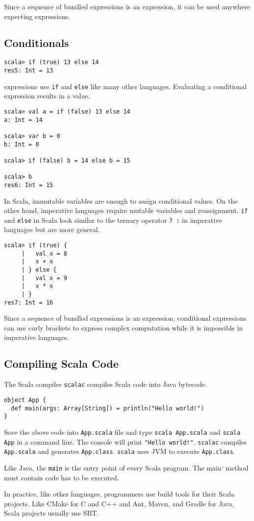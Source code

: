 Since a sequence of bundled expressions is an expression, it can be used
anywhere expecting expressions.

\subsection{Conditionals}

\begin{verbatim}
scala> if (true) 13 else 14
res5: Int = 13
\end{verbatim}

 expressions use \verb+if+ and \verb+else+ like many other languages.
Evaluating a conditional expression results in a value.

\begin{verbatim}
scala> val a = if (false) 13 else 14
a: Int = 14

scala> var b = 0
b: Int = 0

scala> if (false) b = 14 else b = 15

scala> b
res6: Int = 15
\end{verbatim}

In Scala, immutable variables are enough to assign conditional values. On the
other hand, imperative languages require mutable variables and reassignment.
\verb+if+ and \verb+else+ in Scala look similar to the ternary operator \verb+? :+ in
  imperative languages but are more general.

\begin{verbatim}
scala> if (true) {
     |   val x = 8
     |   x + x
     | } else {
     |   val x = 9
     |   x * x
     | }
res7: Int = 16
\end{verbatim}

Since a sequence of bundled expressions is an expression, conditional
expressions can use curly brackets to express complex computation while it is
impossible in imperative languages.

\subsection{Compiling Scala Code}

The Scala compiler \verb+scalac+ compiles Scala code into Java bytecode.

\begin{verbatim}
object App {
  def main(args: Array[String]) = println("Hello world!")
}
\end{verbatim}

Save the above code into \verb+App.scala+ file and type \verb+scala App.scala+ and
\verb+scala App+ in a command line. The console will print \verb+"Hello world!"+. \verb+scalac+
compiles \verb+App.scala+ and generates \verb+App.class+. \verb+scala+ uses JVM to execute
\verb+App.class+.

Like Java, the \verb+main+  is the entry point of every Scala program. The
main` method must contain code has to be executed.

In practice, like other languages, programmers use build tools for their Scala
projects. Like CMake for C and C++ and Ant, Maven, and Gradle for Java, Scala
projects usually use SBT.
